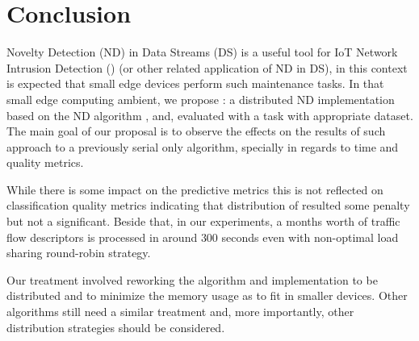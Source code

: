 
\section{Conclusion} 
\label{sec:conclusion}


Novelty Detection (ND) in Data Streams (DS) is a useful tool for
IoT Network Intrusion Detection (\nids) (or other related application of ND in DS),
in this context is expected that small edge devices perform such maintenance tasks.
In that small edge computing ambient, we propose \mfog: a distributed ND implementation
based on the ND algorithm \minas, and, evaluated with a \nids task with appropriate dataset.
The main goal of our proposal is to observe the effects on the results of such approach to
a previously serial only algorithm, specially in regards to time and quality metrics.


While there is some impact on the predictive metrics this is not reflected on
classification quality metrics indicating that distribution of \minas
resulted some penalty but not a significant.
Beside that, in our experiments, a months worth of traffic flow descriptors is
processed in around $300$ seconds even with non-optimal load sharing round-robin strategy.

Our treatment involved reworking the algorithm and implementation to be
distributed and to minimize the memory usage as to fit in smaller devices.
Other algorithms still need a similar treatment and, more importantly, other
distribution strategies should be considered.

